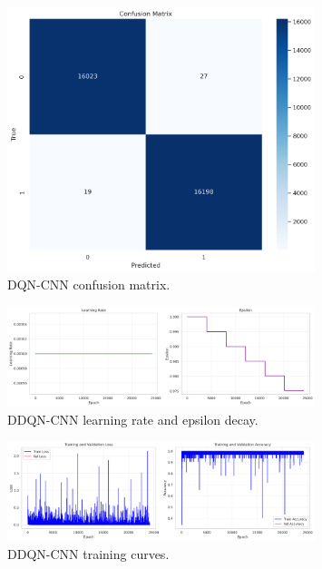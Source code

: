 \documentclass[12pt]{report}
\begin{document}
\begin{figure}[htbp]
    \centering
    \includegraphics[width=0.8\textwidth]{images/dqn_cnn_confusion_matrix.png}
    \caption{DQN-CNN confusion matrix.}
    \label{fig:dqn_cnn_confusion}
\end{figure}

\vspace{0.5cm}

\begin{figure}[htbp]
    \centering
    \includegraphics[width=0.8\textwidth]{images/dqn_cnn_lr_epsilon.png}
    \caption{DDQN-CNN learning rate and epsilon decay.}
    \label{fig:dqn_cnn_lr_epsilon_cnn}
\end{figure}

\vspace{0.5cm}

\begin{figure}[htbp]
    \centering
    \includegraphics[width=0.8\textwidth]{images/dqn_cnn_training_curves.png}
    \caption{DDQN-CNN training curves.}
    \label{fig:dqn_cnn_training_curves}
\end{figure}
\end{document}
